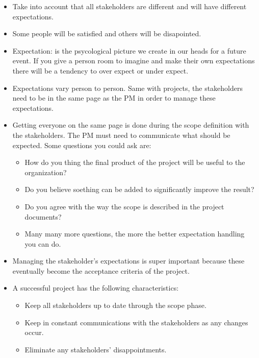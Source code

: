 \begin{itemize}
    \item Take into account that all stakeholders are different and will have different expectations.
    \item Some people will be satisfied and others will be disapointed.
    \item Expectation: is the psycological picture we create in our heads for a future event. If you give a person room to imagine and make their own expectations there will be a tendency to over expect or under expect.
    \item Expectations vary person to person. Same with projects, the stakeholders need to be in the same page as the PM in order to manage these expectations.
    \item Getting everyone on the same page is done during the scope definition with the stakeholders. The PM must need to communicate what should be expected. Some questions you could ask are:
        \begin{itemize}
            \item How do you thing the final product of the project will be useful to the organization?
            \item Do you believe soething can be added to significantly improve the result?
            \item Do you agree with the way the scope is described in the project documents?
            \item Many many more questions, the more the better expectation handling you can do.
        \end{itemize}
    
    \item Managing the stakeholder's expectations is super important because these eventually become the acceptance criteria of the project.
    \item A successful project has the following characteristics:
        \begin{itemize}
            \item Keep all stakeholders up to date through the scope phase.
            \item Keep in constant communications with the stakeholders as any changes occur.
            \item Eliminate any stakeholders' disappointments.
        \end{itemize}
\end{itemize}


